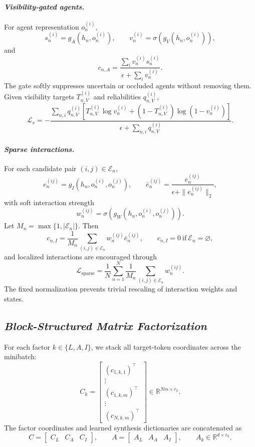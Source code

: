 \paragraph{\textbf{\emph{Visibility-gated agents.}}}
For agent representation $o_n^{(i)}$,
\[
s_n^{(i)}=g_A(h_n,o_n^{(i)}),
\qquad
v_n^{(i)}=\sigma\!\left(g_V(h_n,o_n^{(i)})\right),
\]
and
\[
c_{n,A}
=
\frac{\sum_i v_n^{(i)}s_n^{(i)}}
{\epsilon+\sum_i v_n^{(i)}}.
\]
The gate softly suppresses uncertain or occluded agents without removing them.
Given visibility targets $T_{n,V}^{(i)}$ and reliabilities $q_{n,V}^{(i)}$,
\[
\mathcal L_v
=
-
\frac{
\sum_{n,i}q_{n,V}^{(i)}
\left[
T_{n,V}^{(i)}\log v_n^{(i)}
+
(1-T_{n,V}^{(i)})\log(1-v_n^{(i)})
\right]
}{
\epsilon+\sum_{n,i}q_{n,V}^{(i)}
}.
\]

\paragraph{\textbf{\emph{Sparse interactions.}}}
For each candidate pair $(i,j)\in\mathcal E_n$,
\[
e_n^{(ij)}
=
g_I(h_n,o_n^{(i)},o_n^{(j)}),
\qquad
\bar e_n^{(ij)}
=
\frac{e_n^{(ij)}}{\epsilon+\|e_n^{(ij)}\|_2},
\]
with soft interaction strength
\[
w_n^{(ij)}
=
\sigma\!\left(g_W(h_n,o_n^{(i)},o_n^{(j)})\right).
\]
Let $M_n=\max\{1,|\mathcal E_n|\}$. Then
\[
c_{n,I}
=
\frac{1}{M_n}
\sum_{(i,j)\in\mathcal E_n}
w_n^{(ij)}\bar e_n^{(ij)},
\qquad
c_{n,I}=0
\ \text{if}\ 
\mathcal E_n=\varnothing,
\]
and localized interactions are encouraged through
\[
\mathcal L_{\mathrm{sparse}}
=
\frac{1}{N}
\sum_{n=1}^{N}
\frac{1}{M_n}
\sum_{(i,j)\in\mathcal E_n}
w_n^{(ij)}.
\]
The fixed normalization prevents trivial rescaling of interaction weights and
states.















\subsection{\textbf{\emph{Block-Structured Matrix Factorization}}}

For each factor $k\in\{L,A,I\}$, we stack all target-token coordinates across
the minibatch:
\[
C_k
=
\begin{bmatrix}
(c_{1,k,1})^\top\\[-1mm]
\vdots\\
(c_{1,k,m})^\top\\
\vdots\\
(c_{N,k,m})^\top
\end{bmatrix}
\in\mathbb{R}^{Nm\times r_k}.
\]
The factor coordinates and learned synthesis dictionaries are concatenated as
\[
C=
\begin{bmatrix}
C_L & C_A & C_I
\end{bmatrix},
\qquad
A=
\begin{bmatrix}
A_L & A_A & A_I
\end{bmatrix},
\qquad
A_k\in\mathbb{R}^{d\times r_k}.
\]

